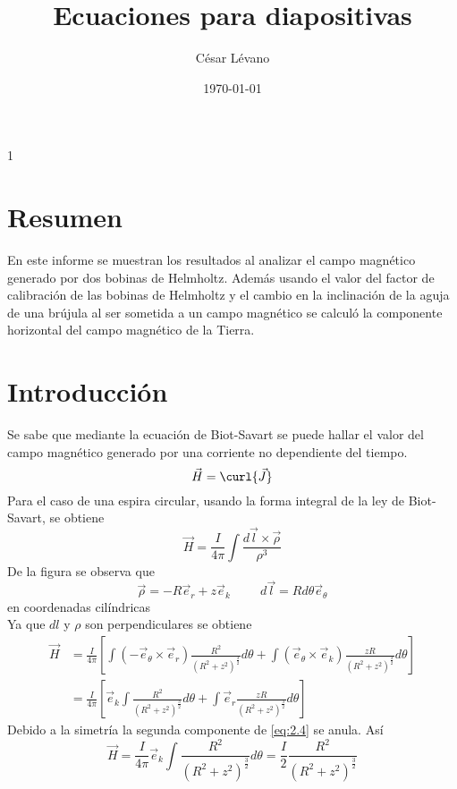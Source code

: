 \documentclass{article}
\title{Ecuaciones para diapositivas}
\author{César Lévano}
\date{\today}
\makeatletter
\let\old@section\section
\def\section{\setcounter{equation}{0}\old@section}
\makeatother
\begin{document}
\maketitle\newpage
\setcounter {page} {1}
\tableofcontents
\section{Resumen}
En este informe se muestran los resultados al analizar el campo magnético generado por dos bobinas de Helmholtz. Además  usando el valor del factor de calibración de las bobinas de Helmholtz y el cambio en la inclinación de la aguja de una brújula al ser sometida a un campo magnético se calculó la componente horizontal del campo magnético de la Tierra.
\section{Introducción}
Se sabe que mediante la ecuación de Biot-Savart se puede hallar el valor del campo magnético generado por una corriente no dependiente del tiempo.
\begin{equation}
	\vec{H}= \curl{\vec{J}}
\end{equation}
Para el caso de una espira circular, usando la forma integral de la ley de Biot-Savart, se obtiene
\begin{equation}
	\vec{H}= \frac{I}{4 \pi }\int \frac{d\vec{l}\times \vec{\rho }}{\rho ^3}
\end{equation}
De la figura se observa que
\begin{equation}
	\vec{\rho }=-R\vec{e}_r+z\vec{e}_k\hspace{1cm}d\vec{l} = R d \theta\vec{e}_ \theta
\end{equation}
en coordenadas cilíndricas\\
Ya que $dl$ y $\rho $ son perpendiculares se obtiene
\begin{align}
	\nonumber\vec{H} & =\frac{I}{4 \pi }\left[\int (-\vec{e}_ \theta \times \vec{e}_r)\frac{R^2}{(R^2+z^2)^{\frac{3 }{2 }}}d \theta+\int (\vec{e}_ \theta \times \vec{e}_k )\frac{zR}{(R^2+z^2)^{\frac{3 }{2 }}}d \theta  \right] \\
	                 & =\frac{I}{4 \pi }\left[\vec{e}_k\int \frac{R^2}{(R^2+z^2)^{\frac{3 }{2 }}}d \theta+ \int \vec{e}_r\frac{zR}{(R^2+z^2)^{\frac{3 }{2 }}}d \theta  \right]\label{eq:2.4}
\end{align}
Debido a la simetría la segunda componente de \eqref{eq:2.4} se anula. Así
\begin{equation}
	\vec{H}=\frac{I}{4 \pi }\vec{e}_k\int \frac{R^2}{(R^2+z^2)^{\frac{3 }{2 }}}d \theta=\frac{I}{2}\frac{R^2}{(R^2+z^2)^\frac{3}{2}}
	\label{eq:2.5}
\end{equation}
\end{document}
